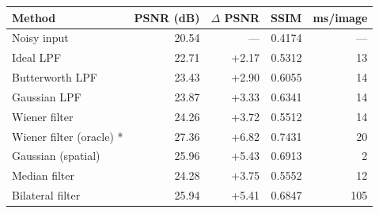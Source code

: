 \begin{tabular}{lrrrr}
\toprule
Method & PSNR (dB) & $\Delta$ PSNR & SSIM & ms/image \\
\midrule
Noisy input & 20.54 & --- & 0.4174 & --- \\
\midrule
Ideal LPF & 22.71 & +2.17 & 0.5312 & 13 \\
Butterworth LPF & 23.43 & +2.90 & 0.6055 & 14 \\
Gaussian LPF & 23.87 & +3.33 & 0.6341 & 14 \\
Wiener filter & 24.26 & +3.72 & 0.5512 & 14 \\
Wiener filter (oracle) * & 27.36 & +6.82 & 0.7431 & 20 \\
Gaussian (spatial) & 25.96 & +5.43 & 0.6913 & 2 \\
Median filter & 24.28 & +3.75 & 0.5552 & 12 \\
Bilateral filter & 25.94 & +5.41 & 0.6847 & 105 \\
\bottomrule
\end{tabular}
